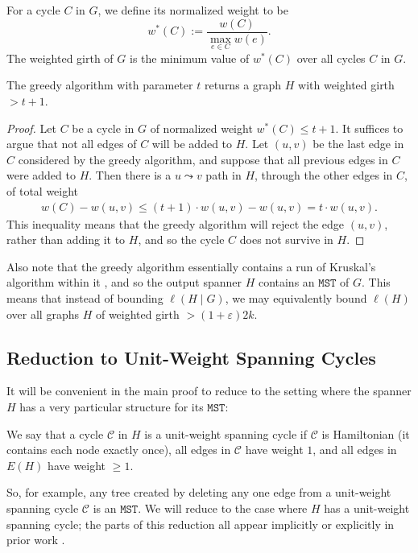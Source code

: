 \documentclass{article}\usepackage[a4paper,margin=20mm]{geometry}
\newcommand{\eps}{\varepsilon}
\newcommand{\cee}{\mathcal{C}}
\newcommand{\mst}{\texttt{MST}}
\begin{document}
\begin{definition} 
For a cycle $C$ in $G$, we define its normalized weight to be
$$w^*(C) := \frac{w(C)}{\max_{e \in C} w(e)}.$$
The weighted girth of $G$ is the minimum value of $w^*(C)$ over all cycles $C$ in $G$.
\end{definition}

\begin{lemma}  \label{lem:wtgirth}
The greedy algorithm with parameter $t$ returns a graph $H$ with weighted girth $>t+1$.
\end{lemma}
\begin{proof}
Let $C$ be a cycle in $G$ of normalized weight $w^*(C) \le t+1$.
It suffices to argue that not all edges of $C$ will be added to $H$.
Let $(u, v)$ be the last edge in $C$ considered by the greedy algorithm, and suppose that all previous edges in $C$ were added to $H$.
Then there is a $u \leadsto v$ path in $H$, through the other edges in $C$, of total weight
\begin{align*}
w(C) - w(u, v) \le (t+1) \cdot w(u, v) - w(u, v) = t \cdot w(u, v).
\end{align*}
This inequality means that the greedy algorithm will reject the edge $(u, v)$, rather than adding it to $H$, and so the cycle $C$ does not survive in $H$.
\end{proof}

Also note that the greedy algorithm essentially contains a run of Kruskal's algorithm within it \cite{CLRS22}, and so the output spanner $H$ contains an $\mst$ of $G$.
This means that instead of bounding $\ell(H \mid G)$, we may equivalently bound $\ell(H)$ over all graphs $H$ of weighted girth $>(1+\eps)2k$.

\subsection{Reduction to Unit-Weight Spanning Cycles \label{sec:utmst}}

It will be convenient in the main proof to reduce to the setting where the spanner $H$ has a very particular structure for its $\mst$:

\begin{definition} 
We say that a cycle $\cee$ in $H$ is a unit-weight spanning cycle if $\cee$ is Hamiltonian (it contains each node exactly once), all edges in $\cee$ have weight $1$, and all edges in $E(H)$ have weight $\ge 1$.
\end{definition}
So, for example, any tree created by deleting any one edge from a unit-weight spanning cycle $\cee$ is an $\mst$.
We will reduce to the case where $H$ has a unit-weight spanning cycle; the parts of this reduction all appear implicitly or explicitly in prior work \cite{CW18, LS23, ENS15}.
\end{document}
